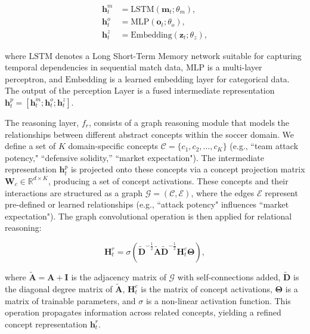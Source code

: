 \documentclass[3p,times,procedia]{elsarticle}
\begin{document}
\begin{equation}
   \begin{aligned}
     \mathbf{h}_t^m &= \text{LSTM}(\mathbf{m}_t; \theta_m), \\
     \mathbf{h}_t^o &= \text{MLP}(\mathbf{o}_t; \theta_o), \\
     \mathbf{h}_t^z &= \text{Embedding}(\mathbf{z}_t; \theta_z),
   \end{aligned}
 \end{equation}

 \noindent
where $\text{LSTM}$ denotes a Long Short-Term Memory network \cite{hochreiter1997long} suitable for capturing temporal dependencies in sequential match data, $\text{MLP}$ is a multi-layer perceptron, and $\text{Embedding}$ is a learned embedding layer for categorical data. The output of the perception Layer is a fused intermediate representation $\mathbf{h}_t^p = [\mathbf{h}_t^m; \mathbf{h}_t^o; \mathbf{h}_t^z]$.

The reasoning layer, $f_r$, consists of a graph reasoning module that models the relationships between different abstract concepts within the soccer domain. We define a set of $K$ domain-specific concepts $\mathcal{C} = \{c_1, c_2, \dots, c_K\}$ (e.g., ``team attack potency," ``defensive solidity,'' ``market expectation"). The intermediate representation $\mathbf{h}_t^p$ is projected onto these concepts via a concept projection matrix $\mathbf{W}_c \in \mathbb{R}^{d \times K}$, producing a set of concept activations. These concepts and their interactions are structured as a graph $\mathcal{G} = (\mathcal{C}, \mathcal{E})$, where the edges $\mathcal{E}$ represent pre-defined or learned relationships (e.g., ``attack potency" influences ``market expectation"). The graph convolutional operation \cite{kipf2016semi} is then applied for relational reasoning:

\begin{equation}
\mathbf{H}_t^r = \sigma\!\left(\tilde{\mathbf{D}}^{-\frac{1}{2}} 
\tilde{\mathbf{A}} 
\tilde{\mathbf{D}}^{-\frac{1}{2}} 
\mathbf{H}_t^c 
\mathbf{\Theta}\right),
\end{equation}

\noindent
where $\tilde{\mathbf{A}} = \mathbf{A} + \mathbf{I}$ is the adjacency matrix of $\mathcal{G}$ with self-connections added, $\tilde{\mathbf{D}}$ is the diagonal degree matrix of $\tilde{\mathbf{A}}$, $\mathbf{H}_t^c$ is the matrix of concept activations, $\mathbf{\Theta}$ is a matrix of trainable parameters, and $\sigma$ is a non-linear activation function. This operation propagates information across related concepts, yielding a refined concept representation $\mathbf{h}_t^r$.
\end{document}
